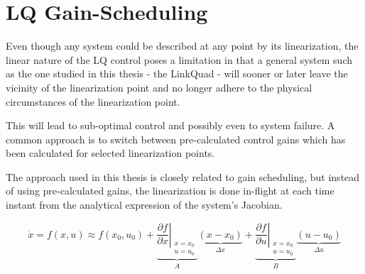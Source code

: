 \section{LQ Gain-Scheduling}
\label{sec:controller:gainscheduling}
    Even though any system could be described at any point by its linearization,
    the linear nature of the LQ control poses a limitation in that
    a general system such as the one studied in this thesis - the LinkQuad - will
    sooner or later leave the vicinity of the linearization point and no
    longer adhere to the physical circumstances of the linearization point.

    This will lead to sub-optimal control and possibly even to system failure.
    A common approach is to switch between pre-calculated control gains
    which has been calculated for selected linearization points.

    The approach used in this thesis is closely related to gain scheduling,
    but instead of using pre-calculated gains, the linearization is done
    in-flight at each time instant from the analytical expression of
    the system's Jacobian.

    \begin{equation}
        \dot{x} = f(x,u) \approx f(x_{0},u_{0})
            + \underbrace{\left. \frac{\partial f}{\partial x} \right|_{
                \begin{array}{l}
                    x=x_{0} \\
                    u=u_{0}
                \end{array}
            }}_{A}
                \underbrace{\left( x-x_{0} \right)}_{\Delta x}
            + \underbrace{\left. \frac{\partial f}{\partial u} \right|_{
                \begin{array}{l}
                    x=x_{0} \\
                    u=u_{0}
                \end{array}
            }}_{B}
                \underbrace{\left( u-u_{0} \right)}_{\Delta u}
    \end{equation}

